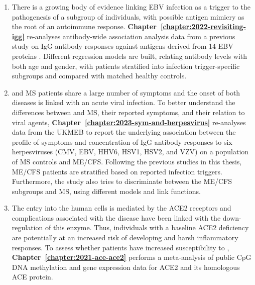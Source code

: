 \begin{enumerate}
    \item There is a growing body of evidence linking EBV infection as a trigger to the pathogenesis of a subgroup of \cfs individuals, with possible antigen mimicry as the root of an autoimmune response. \textbf{Chapter~\ref{chapter:2022-revisiting-igg}} re-analyses antibody-wide association analysis data from a previous study on IgG antibody responses against antigens derived from 14 EBV proteins \citep{loebel2017SerologicalProfiling}. Different regression models are built, relating antibody levels with both age and gender, with \cfs patients stratified into infection trigger-specific subgroups and compared with matched healthy controls.

    \item \cfs and MS patients share a large number of symptoms and the onset of both diseases is linked with an acute viral infection. To better understand the differences between \cfs and MS, their reported symptoms, and their relation to viral agents, \textbf{Chapter~\ref{chapter:2023-sym-and-herpesvirus}} re-analyses data from the UKMEB to report the underlying association between the profile of symptoms and concentration of IgG antibody responses to six herpesviruses (CMV, EBV, HHV6, HSV1, HSV2, and VZV) on a population of MS controls and ME/CFS. Following the previous studies in this thesis, ME/CFS patients are stratified based on reported infection triggers. Furthermore, the study also tries to discriminate between the ME/CFS subgroups and MS, using different models and link functions.

    \item The \sars entry into the human cells is mediated by the ACE2 receptors and complications associated with the disease have been linked with the down-regulation of this enzyme. Thus, individuals with a baseline ACE2 deficiency are potentially at an increased risk of developing \covid and harsh inflammatory responses. To assess whether \cfs patients have increased susceptibility to \covid, \textbf{Chapter~\ref{chapter:2021-ace-ace2}} performs a meta-analysis of public CpG DNA methylation and gene expression data for ACE2 and its homologous ACE protein.
\end{enumerate}

